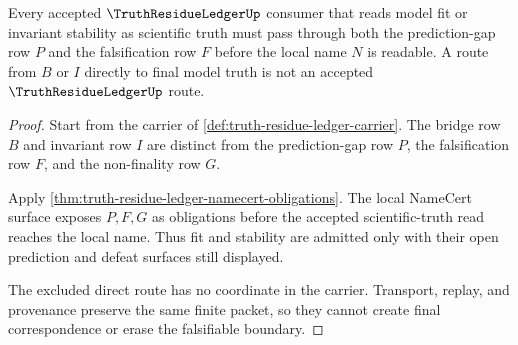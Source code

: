 \begin{theorem}
\label{thm:truth-residue-ledger-falsifiable-boundary}
Every accepted $\TruthResidueLedgerUp$ consumer that reads model fit or invariant stability as scientific truth must pass through both the prediction-gap row $P$ and the falsification row $F$ before the local name $N$ is readable. A route from $B$ or $I$ directly to final model truth is not an accepted $\TruthResidueLedgerUp$ route.
\end{theorem}
\begin{proof}
Start from the carrier of \autoref{def:truth-residue-ledger-carrier}. The bridge row $B$ and invariant row $I$ are distinct from the prediction-gap row $P$, the falsification row $F$, and the non-finality row $G$.

Apply \autoref{thm:truth-residue-ledger-namecert-obligations}. The local NameCert surface exposes $P,F,G$ as obligations before the accepted scientific-truth read reaches the local name. Thus fit and stability are admitted only with their open prediction and defeat surfaces still displayed.

The excluded direct route has no coordinate in the carrier. Transport, replay, and provenance preserve the same finite packet, so they cannot create final correspondence or erase the falsifiable boundary.
\end{proof}

